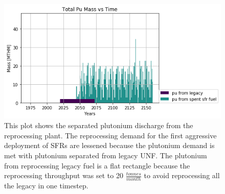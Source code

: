 \begin{figure}[htbp!]
	\begin{center}
		\includegraphics[scale=0.7]{./images/french-transition/pu.png}
	\end{center}
	\caption{This plot shows the separated plutonium discharge from the reprocessing plant.
			 The reprocessing demand for the first aggressive deployment of \glspl{SFR}
			 are lessened because the plutonium demand is met with plutonium separated from legacy \gls{UNF}.
			 The plutonium from reprocessing legacy fuel is a flat rectangle because the 
			 reprocessing throughput was set to 20 $\frac{tonnes}{month}$ to avoid reprocessing
			 all the legacy in one timestep. }
	\label{fig:pu_no_cum}
\end{figure}

